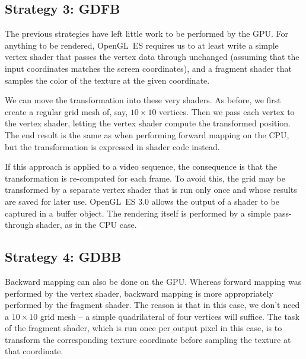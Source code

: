 \documentclass[english,12pt]{ifimaster}
\begin{document}



\subsection{Strategy 3: GDFB}

The previous strategies have left little work to be performed by the
GPU. For anything to be rendered, OpenGL~ES requires us to at least
write a simple vertex shader that passes the vertex data through
unchanged (assuming that the input coordinates matches the screen
coordinates), and a fragment shader that samples the color of the
texture at the given coordinate.

We can move the transformation into these very shaders. As before, we
first create a regular grid mesh of, say, $10 \times 10$ vertices.
Then we pass each vertex to the vertex shader, letting the vertex
shader compute the transformed position. The end result is the same as
when performing forward mapping on the CPU, but the transformation is
expressed in shader code instead.

If this approach is applied to a video sequence, the consequence is
that the transformation is re-computed for each frame. To avoid this,
the grid may be transformed by a separate vertex shader that is run
only once and whose results are saved for later use. OpenGL~ES 3.0
allows the output of a shader to be captured in a buffer object. The
rendering itself is performed by a simple pass-through shader, as in
the CPU case.

\subsection{Strategy 4: GDBB}
\label{sec:implementationgdbb}

Backward mapping can also be done on the GPU. Whereas forward mapping
was performed by the vertex shader, backward mapping is more
appropriately performed by the fragment shader. The reason is that in
this case, we don't need a $10 \times 10$ grid mesh -- a simple
quadrilateral of four vertices will suffice. The task of the fragment
shader, which is run once per output pixel in this case, is to
transform the corresponding texture coordinate before sampling the
texture at that coordinate.
\end{document}
